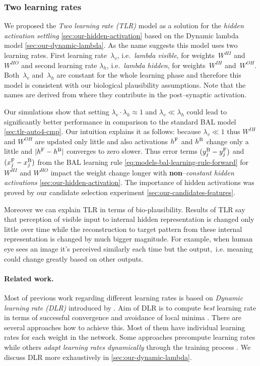 
\subsubsection{Two learning rates} 
\label{sec:our-tlr}

We proposed the \emph{Two learning rate (TLR)} model as a solution for the \emph{hidden activation settling} \ref{sec:our-hidden-activation} based on the Dynamic lambda model \ref{sec:our-dynamic-lambda}. As the name suggests this model uses two learning rates. First learning rate~$\lambda_v$, i.e.~\emph{lambda visible}, for weights~$W^{HI}$ and~$W^{HO}$ and second learning rate $\lambda_h$, i.e.~\emph{lambda hidden}, for weights~$W^{IH}$ and~$W^{OH}$. Both~$\lambda_v$ and~$\lambda_h$ are constant for the whole learning phase and therefore this model is consistent with our biological plausibility assumptions. Note that the names are derived from where they contribute in the post--synaptic activation. 

Our simulations show that setting $\lambda_v \cdot \lambda_h \approx 1$ and $\lambda_v \ll \lambda_h$ could lead to significantly better performance in comparison to the standard BAL model \ref{sec:tlr-auto4-cmp}. Our intuition explains it as follows: because $\lambda_v \ll 1$ thus $W^{IH}$ and $W^{OH}$ are updated only little and also activations $h^{\rm F}$ and $h^{\rm B}$ change only a little and $|h^{\rm F}- h^{\rm B}|$ converges to zero slower. Thus error terms $(y_j^{\rm B} - y_j^{\rm F})$ and $(x_j^{\rm F} - x_j^{\rm B})$ from the BAL learning rule \ref{eq:models-bal-learning-rule-forward} for $W^{HI}$ and $W^{HO}$ impact the weight change longer with {\bf non}--\emph{constant hidden activations} \ref{sec:our-hidden-activation}. The importance of hidden activations was proved by our candidate selection experiment \ref{sec:our-candidates-features}. 

Moreover we can explain TLR in terms of bio-plausibility. Results of TLR say that perception of visible input to internal hidden representation is changed only little over time while the reconstruction to target pattern from these internal representation is changed by much bigger magnitude. For example, when human eye sees an image it's perceived similarly each time but the output,~i.e. meaning could change greatly based on other outputs. 

\paragraph{Related work.} 
Most of previous work regarding different learning rates is based on \emph{Dynamic learning rate (DLR)} introduced by \citet{jacobs1988increased}. Aim of DLR is to compute \emph{best} learning rate in terms of successful convergence and avoidance of local minima \citep{behera2006adaptive}. There are several approaches how to achieve this. Most of them have individual learning rates for each weight in the network. Some approaches precompute learning rates \citep{weir1991method} while others \emph{adapt learning rates dynamically} through the training process \citep{yu1997efficient, magoulas1999improving, yu2002backpropagation}. We discuss DLR more exhaustively in \ref{sec:our-dynamic-lambda}. 

